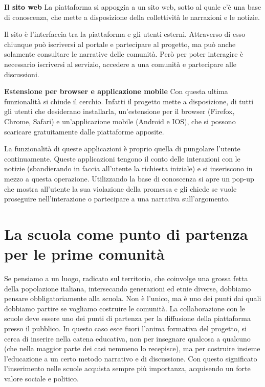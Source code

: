 \documentclass{article}
\begin{document}
\vspace{0.5 cm}

\textbf{Il sito web} La piattaforma si appoggia a un sito web, sotto al quale c’è una base di conoscenza, che mette a disposizione della collettività le narrazioni e le notizie.

Il sito è l’interfaccia tra la piattaforma e gli utenti esterni. Attraverso di esso chiunque può iscriversi al portale e partecipare al progetto, ma può anche solamente consultare le narrative delle comunità. Però per poter interagire è necessario iscriversi al servizio, accedere a una comunità e partecipare alle discussioni. 

\vspace{0.5 cm}

\textbf{Estensione per browser e applicazione mobile} Con questa ultima funzionalità si chiude il cerchio. Infatti il progetto mette a disposizione, di tutti gli utenti che desiderano installarla, un’estensione per il browser (Firefox, Chrome, Safari) e un’applicazione mobile (Android e IOS), che si possono scaricare gratuitamente dalle piattaforme apposite.

\vspace{0.5 cm}

La funzionalità di queste applicazioni è proprio quella di pungolare l’utente continuamente. Queste applicazioni tengono il conto delle interazioni con le notizie (sbandierando in faccia all’utente la richiesta iniziale) e si inseriscono in mezzo a questa operazione. Utilizzando la base di conoscenza si apre un pop-up che mostra all’utente la sua violazione della promessa e gli chiede se vuole proseguire nell’interazione o partecipare a una narrativa sull’argomento.

\section{La scuola come punto di partenza per le prime comunità}
\label{sec:scuo-part}

 Se pensiamo a un luogo, radicato sul territorio, che coinvolge una grossa fetta della popolazione italiana, intersecando generazioni ed etnie diverse, dobbiamo pensare obbligatoriamente alla scuola. Non è l’unico, ma è uno dei punti dai quali dobbiamo partire se vogliamo costruire le comunità. La collaborazione con le scuole deve essere uno dei punti di partenza per la diffusione della piattaforma presso il pubblico. In questo caso esce fuori l’anima formativa del progetto, si cerca di inserire nella catena educativa, non per insegnare qualcosa a qualcuno (che nella maggior parte dei casi nemmeno lo recepisce), ma per costruire insieme l’educazione a un certo metodo narrativo e di discussione. Con questo significato l’inserimento nelle scuole acquista sempre più importanza, acquisendo un forte valore sociale e politico. 
 
\end{document}
